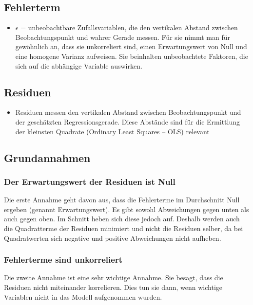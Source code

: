 \documentclass[10pt,a4paper]{article}
\begin{document}
            \subsection{Fehlerterm}
            \begin{itemize}
                \item $\epsilon$ = unbeobachtbare Zufallsvariablen, die den vertikalen Abstand zwischen Beobachtungspunkt und wahrer Gerade messen. Für sie nimmt man für gewöhnlich an, dass sie unkorreliert sind, einen Erwartungswert von Null und eine homogene Varianz aufweisen. Sie beinhalten unbeobachtete Faktoren, die sich auf die abhängige Variable auswirken.
            \end{itemize}

        \subsection{Residuen}
            \begin{itemize}
                \item Residuen messen den vertikalen Abstand zwischen Beobachtungspunkt und der geschätzten Regressionsgerade. Diese Abstände sind für die Ermittlung der kleinsten Quadrate (Ordinary Least Squares -- OLS) relevant
            \end{itemize}
    \subsection{Grundannahmen}
        \subsubsection{Der Erwartungswert der Residuen ist Null}
        Die erste Annahme geht davon aus, dass die Fehlerterme im Durchschnitt Null ergeben (genannt Erwartungswert). Es gibt sowohl Abweichungen gegen unten als auch gegen oben. Im Schnitt heben sich diese jedoch auf. Deshalb werden auch die Quadratterme der Residuen minimiert und nicht die Residuen selber, da bei Quadratwerten sich negative und positive Abweichungen nicht aufheben.

        \subsubsection{Fehlerterme sind unkorreliert}
        Die zweite Annahme ist eine sehr wichtige Annahme. Sie besagt, dass die Residuen nicht miteinander korrelieren. Dies tun sie dann, wenn wichtige Variablen nicht in das Modell aufgenommen wurden.
\end{document}
